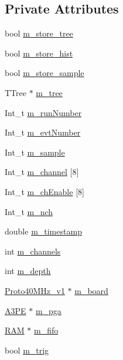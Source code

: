 \subsection*{Private Attributes}
\begin{DoxyCompactItemize}
\item 
bool \hyperlink{classAcquisition_aca2143e9135e25554e58327475a767c5}{m\_\-store\_\-tree}
\item 
bool \hyperlink{classAcquisition_a08f70edd83751dbdab4c8190dc4b9188}{m\_\-store\_\-hist}
\item 
bool \hyperlink{classAcquisition_a987cc1d04007cf1f5acc1accfd0909e5}{m\_\-store\_\-sample}
\item 
TTree $\ast$ \hyperlink{classAcquisition_a70f10db9c972f22a60bd2b82750168da}{m\_\-tree}
\item 
Int\_\-t \hyperlink{classAcquisition_afd35e220e0bfda7e763584524273aeb0}{m\_\-runNumber}
\item 
Int\_\-t \hyperlink{classAcquisition_a32a70daa3f653eae5eafc46dbd0e11a6}{m\_\-evtNumber}
\item 
Int\_\-t \hyperlink{classAcquisition_a154e5423720ab1f2c4ab5cd125cb4e80}{m\_\-sample}
\item 
Int\_\-t \hyperlink{classAcquisition_a1123502b520aec97ee8a71039abaa3fb}{m\_\-channel} \mbox{[}8\mbox{]}
\item 
Int\_\-t \hyperlink{classAcquisition_ad323c9602565eec8e41f573d441745e2}{m\_\-chEnable} \mbox{[}8\mbox{]}
\item 
Int\_\-t \hyperlink{classAcquisition_a1860c7a03a65ea7a778d30dd4a40e1e1}{m\_\-nch}
\item 
double \hyperlink{classAcquisition_aa88cf8d27e075b5aaddb309dfb42cd04}{m\_\-timestamp}
\item 
int \hyperlink{classAcquisition_aedc8b29f322ef00540797fbd0d5112d1}{m\_\-channels}
\item 
int \hyperlink{classAcquisition_a26628424533a2dd74d24712a14637a72}{m\_\-depth}
\item 
\hyperlink{classProto40MHz__v1}{Proto40MHz\_\-v1} $\ast$ \hyperlink{classAcquisition_a9b0db99be79d61ae78dae8a9e4efceab}{m\_\-board}
\item 
\hyperlink{classA3PE}{A3PE} $\ast$ \hyperlink{classAcquisition_aac113fd42c6574cdb4154e9808a21b67}{m\_\-pga}
\item 
\hyperlink{classRAM}{RAM} $\ast$ \hyperlink{classAcquisition_a8a893e7485e96da01185df6d1109c0bc}{m\_\-fifo}
\item 
bool \hyperlink{classAcquisition_a953bdc1bf56206b6df33b648af32a24f}{m\_\-trig}

\end{DoxyCompactItemize}
